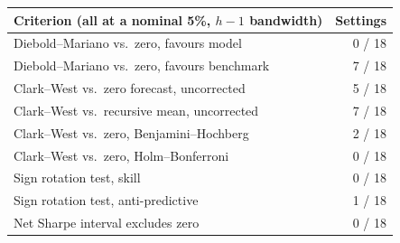 \begin{tabular}{lr}
\toprule
Criterion (all at a nominal 5\%, $h-1$ bandwidth) & Settings \\
\midrule
Diebold--Mariano vs.\ zero, favours model & 0 / 18 \\
Diebold--Mariano vs.\ zero, favours benchmark & 7 / 18 \\
\addlinespace
Clark--West vs.\ zero forecast, uncorrected & 5 / 18 \\
Clark--West vs.\ recursive mean, uncorrected & 7 / 18 \\
\addlinespace
Clark--West vs.\ zero, Benjamini--Hochberg & 2 / 18 \\
Clark--West vs.\ zero, Holm--Bonferroni & 0 / 18 \\
\addlinespace
Sign rotation test, skill & 0 / 18 \\
Sign rotation test, anti-predictive & 1 / 18 \\
Net Sharpe interval excludes zero & 0 / 18 \\
\bottomrule
\end{tabular}

